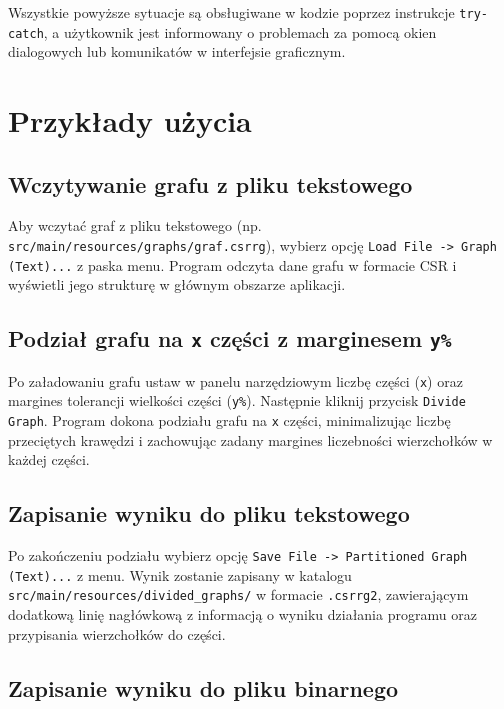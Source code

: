 \documentclass{article}
\begin{document}
    Wszystkie powyższe sytuacje są obsługiwane w kodzie poprzez instrukcje \texttt{try-catch}, a użytkownik jest informowany o problemach za pomocą okien dialogowych lub komunikatów w interfejsie graficznym.
    



\section{Przykłady użycia}

    \subsection{Wczytywanie grafu z pliku tekstowego}
    
    Aby wczytać graf z pliku tekstowego (np. \texttt{src/main/resources/graphs/graf.csrrg}), wybierz opcję \texttt{Load File -> Graph (Text)...} z paska menu. Program odczyta dane grafu w formacie CSR i wyświetli jego strukturę w głównym obszarze aplikacji.
    
    \subsection{Podział grafu na \texttt{x} części z marginesem \texttt{y\%}}
    
    Po załadowaniu grafu ustaw w panelu narzędziowym liczbę części (\texttt{x}) oraz margines tolerancji wielkości części (\texttt{y\%}). Następnie kliknij przycisk \texttt{Divide Graph}. Program dokona podziału grafu na \texttt{x} części, minimalizując liczbę przeciętych krawędzi i zachowując zadany margines liczebności wierzchołków w każdej części.
    
    \subsection{Zapisanie wyniku do pliku tekstowego}
    
    Po zakończeniu podziału wybierz opcję \texttt{Save File -> Partitioned Graph (Text)...} z menu. Wynik zostanie zapisany w katalogu \texttt{src/main/resources/divided\_graphs/} w formacie \texttt{.csrrg2}, zawierającym dodatkową linię nagłówkową z informacją o wyniku działania programu oraz przypisania wierzchołków do części.
    
    \subsection{Zapisanie wyniku do pliku binarnego}
    
\end{document}
